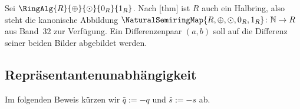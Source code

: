 \documentclass[main.tex]{subfiles}
\begin{document}
Sei \(\RingAlg{R}{\oplus}{\odot}{0_R}{1_R}\). Nach
[thm] ist \(R\) auch ein Halbring,
also steht die kanonische Abbildung
\(\NaturalSemiringMap{R,\oplus,\odot,0_R,1_R}\colon\mathbb N\to R\)
aus Band~32 zur Verfügung. Ein Differenzenpaar \((a,b)\) soll auf die
Differenz seiner beiden Bilder abgebildet werden.

\subsection{Repräsentantenunabhängigkeit}

Im folgenden Beweis kürzen wir
\(\bar q:=-q\) und \(\bar s:=-s\) ab.
\end{document}
